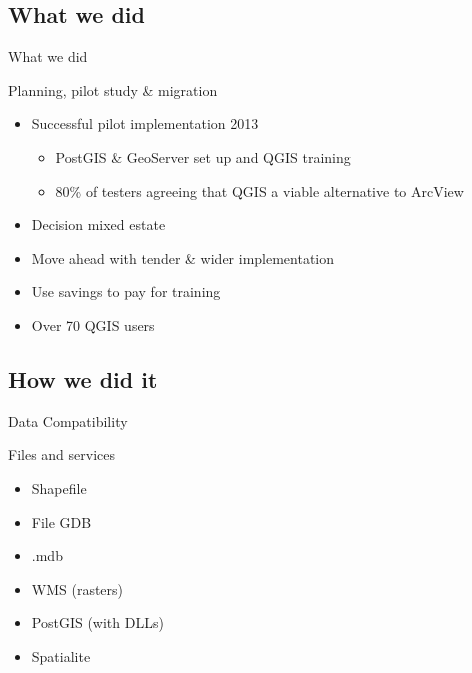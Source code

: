 \subsection{What we did}
\begin{frame}{What we did}
	\begin{block}{Planning, pilot study \& migration}
		\begin{itemize}
			\item Successful pilot implementation 2013
				\begin{itemize}
					\item PostGIS \& GeoServer set up and QGIS training
					\item 80\%  of testers agreeing that QGIS a viable alternative to ArcView
				\end{itemize}
			\item Decision \- mixed estate
			\item Move ahead with tender \& wider implementation
			
			\item Use savings to pay for training
			
			
			\item Over 70 QGIS users
			
		
			
		\end{itemize}
	\end{block}
\end{frame}


\subsection{How we did it}
\begin{frame}{Data Compatibility}
	\begin{block}{Files and services}
		\begin{itemize}
			\item Shapefile
			\item File GDB
			\item .mdb
			\item WMS (rasters)
			\item PostGIS (with DLLs)
			
			
			\item Spatialite
		
											
		\end{itemize}
	\end{block}
\end{frame}


